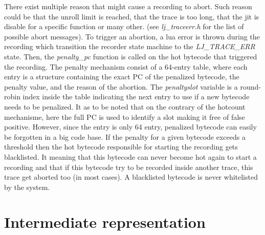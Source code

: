 There exist multiple reason that might cause a recording to abort. Such reason
could be that the unroll limit is reached, that the trace is too long, that the
jit is disable for a specific function or many other. (see \emph{lj\_traceerr.h}
for the list of possible abort messages). To trigger an abortion, a lua error is
thrown during the recording which transition the recorder state machine to the
\emph{LJ\_TRACE\_ERR} state. Then, the \emph{penalty\_pc} function is called on
the hot bytecode that triggered the recording. The penalty mechanism consist of
a 64-entry table, where each entry is a structure containing the exact PC of the
penalized bytecode, the penalty value, and the reason of the abortion. The
\emph{penaltyslot} variable is a round-robin index inside the table indicating
the next entry to use if a new bytecode needs to be penalized. It as to be noted
that on the contrary of the hotcount mechanisme, here the full PC is used to
identify a slot making it free of false positive. However, since the entry is
only 64 entry, penalized bytecode can easily be forgotten in a big code base.
If the penalty for a given bytecode exceeds a threshold then the hot bytecode
responsible for starting the recording gets blacklisted. It meaning that this
bytecode can never become hot again to start a recording and that if this
bytecode try to be recorded inside another trace, this trace get aborted too
(in most cases). A blacklisted bytecode is never whitelisted by the system.


\section{Intermediate representation}
\label{Sec:IR}

